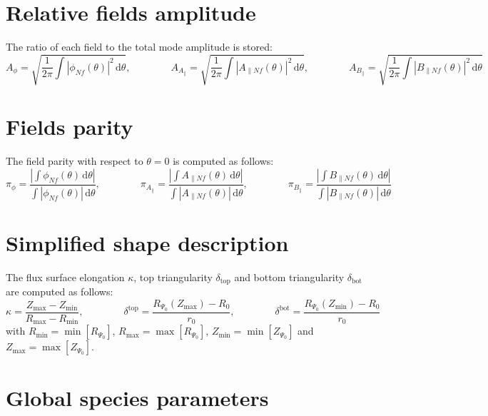 \documentclass[a4paper]{report}
\begin{document}
\section{Relative fields amplitude}
The ratio of each field to the total mode amplitude is stored:
\begin{equation*}
A_\phi = \sqrt{\frac{1}{2\pi}\int |\phi_{Nf}(\theta)|^2\,\textrm{d}\theta}, \qquad \qquad
A_{A_\parallel} = \sqrt{\frac{1}{2\pi}\int |A_{\parallel Nf}(\theta)|^2\,\textrm{d}\theta}, \qquad \qquad
A_{B_\parallel} = \sqrt{\frac{1}{2\pi}\int |B_{\parallel Nf}(\theta)|^2\,\textrm{d}\theta}
\end{equation*}

\section{Fields parity}
The field parity with respect to $\theta=0$ is computed as follows:
\begin{equation*}
\pi_\phi = \frac{\left| \int \phi_{Nf}(\theta) \,\textrm{d}\theta \right|}{\int |\phi_{Nf}(\theta)| \,\textrm{d}\theta}, \qquad \qquad 
\pi_{A_\parallel} = \frac{\left| \int A_{\parallel Nf}(\theta) \,\textrm{d}\theta \right|}{\int |A_{\parallel Nf}(\theta)| \,\textrm{d}\theta}, \qquad \qquad 
\pi_{B_\parallel} = \frac{\left| \int B_{\parallel Nf}(\theta) \,\textrm{d}\theta \right|}{\int |B_{\parallel Nf}(\theta)| \,\textrm{d}\theta}
\end{equation*}

\section{Simplified shape description}
The flux surface elongation $\kappa$, top triangularity $\delta_\textrm{top}$ and bottom triangularity $\delta_\textrm{bot}$ are computed as follows:
\begin{equation*}
\kappa = \frac{Z_\textrm{max}-Z_\textrm{min}}{R_\textrm{max}-R_\textrm{min}}, \qquad \qquad \delta^\textrm{top} = \frac{R_{\Psi_0}(Z_\textrm{max})-R_0}{r_0}, \qquad \qquad \delta^\textrm{bot} = \frac{R_{\Psi_0}(Z_\textrm{min})-R_0}{r_0}
\end{equation*}
with $R_\textrm{min}=\min[R_{\Psi_0}]$, $R_\textrm{max}=\max[R_{\Psi_0}]$, $Z_\textrm{min}=\min[Z_{\Psi_0}]$ and $Z_\textrm{max}=\max[Z_{\Psi_0}]$.

\section{Global species parameters}
\end{document}
